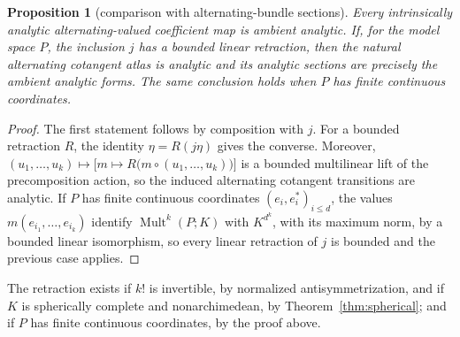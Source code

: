 \documentclass[11pt]{amsart}
\newtheorem{proposition}[theorem]{Proposition}
\theoremstyle{definition}
\theoremstyle{remark}
\numberwithin{equation}{section}
\newcommand{\Mult}{\operatorname{Mult}}
\theoremstyle{plain}
\theoremstyle{definition}
\theoremstyle{plain}
\begin{document}
\begin{proposition}[comparison with alternating-bundle sections]\label{prop:ambient-agreement}
Every intrinsically analytic alternating-valued coefficient map is ambient analytic. If, for the model space $P$, the inclusion $j$ has a bounded linear retraction, then the natural alternating cotangent atlas is analytic and its analytic sections are precisely the ambient analytic forms. The same conclusion holds when $P$ has finite continuous coordinates.
\end{proposition}

\begin{proof}
The first statement follows by composition with $j$. For a bounded retraction $R$, the identity $\eta=R(j\eta)$ gives the converse. Moreover, $(u_1,\ldots,u_k)\mapsto\bigl[m\mapsto R\bigl(m\circ(u_1,\ldots,u_k)\bigr)\bigr]$ is a bounded multilinear lift of the precomposition action, so the induced alternating cotangent transitions are analytic. If $P$ has finite continuous coordinates $(e_i,e^*_i)_{i\le d}$, the values $m(e_{i_1},\ldots,e_{i_k})$ identify $\Mult^k(P;K)$ with $K^{d^k}$, with its maximum norm, by a bounded linear isomorphism, so every linear retraction of $j$ is bounded and the previous case applies.
\end{proof}

The retraction exists if $k!$ is invertible, by normalized antisymmetrization, and if $K$ is spherically complete and nonarchimedean, by Theorem~\ref{thm:spherical}; and if $P$ has finite continuous coordinates, by the proof above.
\end{document}
